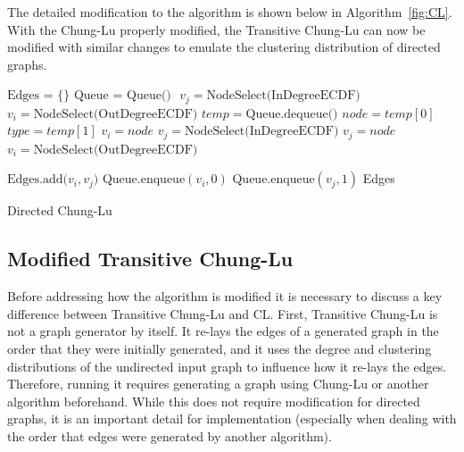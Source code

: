 \documentclass[pdftex,11pt,a4paper,twocolumn]{scrartcl}
\begin{document}
The detailed modification to the algorithm is shown below in Algorithm~\ref{fig:CL}. With the Chung-Lu properly modified, the Transitive Chung-Lu can now be modified with similar changes to emulate the clustering distribution of directed graphs. 

\begin{algorithm}[width=\columnwidth, b]
\begin{minipage}{\columnwidth}
\begin{algorithmic} 
\STATE $\mbox{Edges = \{\} }$
\STATE $\mbox{Queue = Queue() }$
\STATE $v_j = \mbox{NodeSelect(InDegreeECDF)}$
\STATE $v_i = \mbox{NodeSelect(OutDegreeECDF)}$
\ELSE
\STATE $temp = \mbox{Queue.dequeue()}$
\STATE $node = temp[0]$
\STATE $type = temp[1]$
\STATE $v_i = node$
\STATE $v_j = \mbox{NodeSelect(InDegreeECDF)}$ 
\ELSE
\STATE $v_j = node$
\STATE $v_i = \mbox{NodeSelect(OutDegreeECDF)}$ 
\ENDIF
\ENDIF

\STATE $\mbox{Edges.add(}v_i,v_j\mbox{)}$
\ELSE
\STATE $\mbox{Queue.enqueue}(v_i,0)$
\STATE $\mbox{Queue.enqueue}(v_j,1)$
\ENDIF
\ENDFOR
\RETURN Edges
\end{algorithmic}
\caption{Directed Chung-Lu}
\label{fig:CL}
\end{minipage}
\end{algorithm}


\subsection{Modified Transitive Chung-Lu}

Before addressing how the algorithm is modified it is necessary to discuss a key difference between Transitive Chung-Lu and CL. First, Transitive Chung-Lu is not a graph generator by itself. It re-lays the edges of a generated graph in the order that they were initially generated, and it uses the degree and clustering distributions of the undirected input graph to influence how it re-lays the edges. Therefore, running it requires generating a graph using Chung-Lu or another algorithm beforehand. While this does not require modification for directed graphs, it is an important detail for implementation (especially when dealing with the order that edges were generated by another algorithm). 
\end{document}

